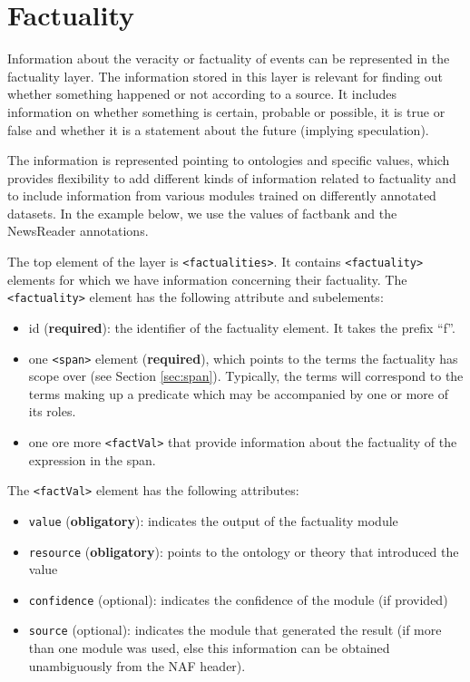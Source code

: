 \section{Factuality}
\label{sec:factuality}

Information about the veracity or factuality of events can be represented in the factuality layer. The information stored in this layer is relevant for finding out whether something happened or not according to a source. It includes information on whether something is certain, probable or possible, it is true or false and whether it is a statement about the future (implying speculation).

The  information is represented pointing to ontologies and specific values, which provides flexibility to add different kinds of information related to factuality and to include information from various modules trained on differently annotated datasets. In the example below, we use the values of factbank and the NewsReader annotations.

The top element of the layer is {\tt <factualities>}. It contains {\tt <factuality>} elements for which we have information concerning their factuality. The \texttt{<factuality>} element has the following attribute and subelements:

\begin{itemize}
\item id (\textbf{required}): the identifier of the factuality element. It takes the prefix ``f''.
\item one {\tt <span>} element (\textbf{required}), which points to the
  terms the factuality has scope over (see Section
  \ref{sec:span}). Typically, the terms will correspond to the
  terms making up a predicate which may be accompanied by one or more of its
  roles.
\item one ore more {\tt <factVal>} that provide information about the factuality of the expression in the span.
\end{itemize}

The {\tt <factVal>} element has the following attributes:

\begin{itemize}
\item \texttt{value} (\textbf{obligatory}): indicates the output of the factuality module
\item \texttt{resource} (\textbf{obligatory}): points to the ontology or theory that introduced the value
\item \texttt{confidence} (optional): indicates the confidence of the module (if provided)
\item \texttt{source} (optional): indicates the module that generated the result (if more than one module was used, else this information can be obtained unambiguously from the NAF header).
\end{itemize}

